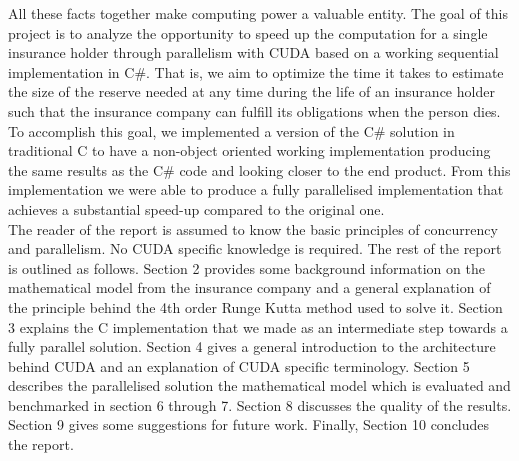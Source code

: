 All these facts together make computing power a valuable entity. The goal of this project is to analyze the opportunity to speed up the computation for a single insurance holder through parallelism with CUDA based on a working sequential implementation in C\#. That is,  we aim to optimize the time it takes to estimate the size of the reserve needed at any time during the life of an insurance holder such that the insurance company can fulfill its obligations when the person dies. To accomplish this goal, we implemented a version of the C\# solution in traditional C to have a non-object oriented working implementation producing the same results as the C\# code and looking closer to the end product. From this implementation we were able to produce a fully parallelised implementation that achieves a substantial speed-up compared to the original one.\\

The reader of the report is assumed to know the basic principles of concurrency and parallelism. No CUDA specific knowledge is required. The rest of the report is outlined as follows. Section 2 provides some background information on the mathematical model from the insurance company and a general explanation of the principle behind the 4th order Runge Kutta method used to solve it. Section 3 explains the C implementation that we made as an intermediate step towards a fully parallel solution. Section 4 gives a general introduction to the architecture behind CUDA and an explanation of CUDA specific terminology. Section 5 describes the parallelised solution the mathematical model which is evaluated and benchmarked in section 6 through 7. Section 8 discusses the quality of the results. Section 9 gives some suggestions for future work. Finally, Section 10 concludes the report.
